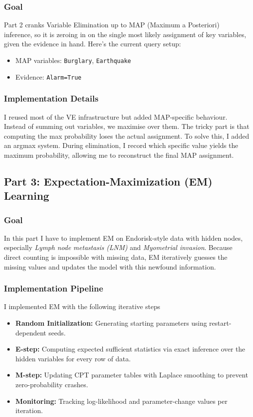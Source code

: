 \documentclass[11pt,a4paper]{article}
\begin{document}
\subsubsection{Goal}
Part 2 cranks Variable Elimination up to MAP (Maximum a Posteriori) inference, so it is zeroing in on the single most likely assignment of key variables, given the evidence in hand. Here’s the current query setup:
\begin{itemize}
    \item MAP variables: \texttt{Burglary}, \texttt{Earthquake}
    \item Evidence: \texttt{Alarm=True}
\end{itemize}

\subsubsection{Implementation Details}
I reused most of the VE infrastructure but added MAP-specific behaviour. Instead of summing out variables, we maximise over them. The tricky part is that computing the max probability loses the actual assignment. To solve this, I added an argmax system. During elimination, I record which specific value yields the maximum probability, allowing me to reconstruct the final MAP assignment.

\subsection{Part 3: Expectation-Maximization (EM) Learning}
\subsubsection{Goal}
In this part I have to implement EM on Endorisk-style data with hidden nodes, especially \textit{Lymph node metastasis (LNM)} and \textit{Myometrial invasion}. Because direct counting is impossible with missing data, EM iteratively guesses the missing values and updates the model with this newfound information.

\subsubsection{Implementation Pipeline}
I implemented EM with the following iterative steps
\begin{itemize}
    \item \textbf{Random Initialization:} Generating starting parameters using restart-dependent seeds.
    \item \textbf{E-step:} Computing expected sufficient statistics via exact inference over the hidden variables for every row of data.
    \item \textbf{M-step:} Updating CPT parameter tables with Laplace smoothing to prevent zero-probability crashes.
    \item \textbf{Monitoring:} Tracking log-likelihood and parameter-change values per iteration.
\end{itemize}
\end{document}
